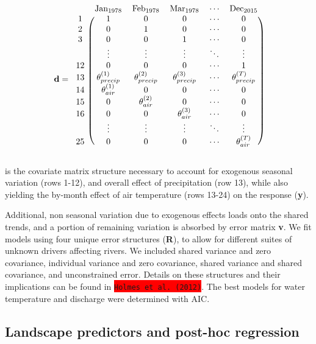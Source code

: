 \documentclass{article}
\begin{document}
$$
\textbf{d} = \begin{blockarray}{cccccc}
& \textrm{Jan}_{1978} & \textrm{Feb}_{1978} & \textrm{Mar}_{1978} & \cdots & \textrm{Dec}_{2015} \\
\begin{block}{c(ccccc)}
    1 & 1 & 0 & 0 & \cdots & 0 \\
    2 & 0 & 1 & 0 & \cdots & 0 \\
    3 & 0 & 0 & 1 & \cdots & 0 \\
      & \vdots & \vdots & \vdots & \ddots & \vdots \\
    12 & 0 & 0 & 0 & \cdots & 1 \\
    13 & \theta_{precip}^{(1)} & \theta_{precip}^{(2)} & \theta_{precip}^{(3)} & \cdots & \theta_{precip}^{(T)} \\
    14 & \theta_{air}^{(1)} & 0 & 0 & \cdots & 0 \\
    15 & 0 & \theta_{air}^{(2)} & 0 & \cdots & 0 \\
    16 & 0 & 0 & \theta_{air}^{(3)} & \cdots & 0 \\
      & \vdots & \vdots & \vdots & \ddots & \vdots \\
    25 & 0 & 0 & 0 & \cdots & \theta_{air}^{(T)} \\
\end{block}
\end{blockarray}
$$

is the covariate matrix structure necessary to account for exogenous seasonal variation (rows 1-12), and overall effect of precipitation (row 13), while also yielding the by-month effect of air temperature (rows 13-24) on the response (\textbf{y}).

Additional, non seasonal variation due to exogenous effects loads onto the shared trends, and a portion of remaining variation is absorbed by error matrix \textbf{v}. We fit models using four unique error structures (\textbf{R}), to allow for different suites of unknown drivers affecting rivers. We included shared variance and zero covariance, individual variance and zero covariance, shared variance and shared covariance, and unconstrained error. Details on these structures and their implications can be found in \colorbox{red}{\lstinline{Holmes et al. (2012)}}. The best models for water temperature and discharge were determined with AIC.

\subsection*{Landscape predictors and post-hoc regression}
\end{document}
